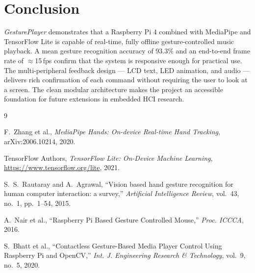 \documentclass[sigconf, nonacm]{acmart}
\begin{document}
\section{Conclusion}

\textit{GesturePlayer} demonstrates that a Raspberry Pi 4 combined with MediaPipe and TensorFlow Lite is capable of real-time, fully offline gesture-controlled music playback. A mean gesture recognition accuracy of 93.3\% and an end-to-end frame rate of $\approx$15\,fps confirm that the system is responsive enough for practical use. The multi-peripheral feedback design — LCD text, LED animation, and audio — delivers rich confirmation of each command without requiring the user to look at a screen. The clean modular architecture makes the project an accessible foundation for future extensions in embedded HCI research.

\begin{thebibliography}{9}

F.~Zhang et al.,
\textit{MediaPipe Hands: On-device Real-time Hand Tracking},
arXiv:2006.10214, 2020.

TensorFlow Authors,
\textit{TensorFlow Lite: On-Device Machine Learning},
\url{https://www.tensorflow.org/lite}, 2021.

S.~S.~Rautaray and A.~Agrawal,
``Vision based hand gesture recognition for human computer interaction: a survey,''
\textit{Artificial Intelligence Review}, vol.~43, no.~1, pp.~1--54, 2015.

A.~Nair et al.,
``Raspberry Pi Based Gesture Controlled Mouse,''
\textit{Proc. ICCCA}, 2016.

S.~Bhatt et al.,
``Contactless Gesture-Based Media Player Control Using Raspberry Pi and OpenCV,''
\textit{Int. J. Engineering Research \& Technology}, vol.~9, no.~5, 2020.

\end{thebibliography}
\end{document}
